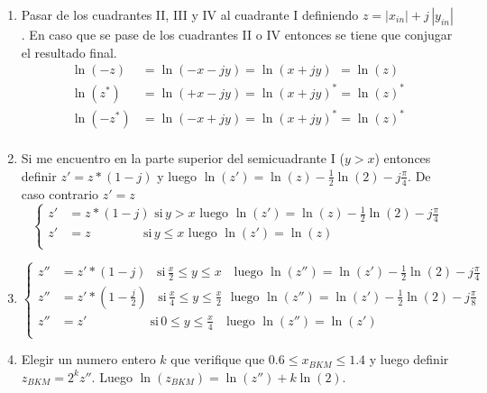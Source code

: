 \documentclass[10pt,a4paper]{book}
\begin{document}
   \begin{enumerate}
      \item{Pasar de los cuadrantes II, III y IV al cuadrante I definiendo $z = |x_{in}| + j \, |y_{in}|$. En caso que se pase de los cuadrantes II o IV entonces se tiene que conjugar el resultado final.
   \begin{equation} \label{eq:log_z_prop}
      \begin{aligned}
         \ln(-z)        &=\ln(-x -j y)  = \ln( x+ j y)    \ \,  =\ln(z)        \\
         \ln( z^\ast)   &=\ln(+x -j y)  = {\ln( x+ j y)}^{\ast} =\ln(z)^\ast   \\
         \ln(-z^\ast)   &=\ln(-x +j y)  = {\ln( x+ j y)}^{\ast} =\ln(z)^\ast   \\
      \end{aligned}
   \end{equation}
      }
      \item{Si me encuentro en la parte superior del semicuadrante I ($y>x$) entonces definir $z'=z*(1-j)$ y luego $\ln(z')=\ln(z)-\frac{1}{2}\ln(2)-j\frac{\pi}{4}$. De caso contrario $z'=z$
         \begin{equation} \label{eq:L_range_ext_2}
            \left\{
               \begin{aligned}
                  z' &= z*(1-j) \,\,                  \text{si}\, y   >  x    \,\,\text{luego}\,\, \ln(z')=\ln(z)-\frac{1}{2}\ln(2)-j\frac{\pi}{4}\\
                  z' &= z       \quad\quad\quad\quad\,\text{si}\, y \leq x    \,\,\text{luego}\,\, \ln(z')=\ln(z)                                 \\
               \end{aligned}
            \right.
         \end{equation}

      }
      \item{
         \begin{equation} \label{eq:L_range_ext_3}
            \left\{
               \begin{aligned}
                  z'' &= z'*(1-j)            \,\,\,\,\,  \text{si}\, \frac{x}{2} \leq y \leq        x       \,\,\,\,\,\,\text{luego}\,\, \ln(z'')=\ln(z')-\frac{1}{2}\ln(2)-j\frac{\pi}{4}\\
                  z'' &= z'*(1-\frac{j}{2})  \,\,\,\,\,  \text{si}\, \frac{x}{4} \leq y \leq  \frac{x}{2}       \,\,\,\,\text{luego}\,\, \ln(z'')=\ln(z')-\frac{1}{2}\ln(2)-j\frac{\pi}{8}\\
                  z'' &= z' \quad\quad\quad\quad\quad    \text{si}\, 0           \leq y \leq  \frac{x}{4}   \,\,\,\,\,\,\text{luego}\,\, \ln(z'')=\ln(z')                                 \\
               \end{aligned}
            \right.
         \end{equation}
      }
   \item{Elegir un numero entero $k$ que verifique que $0.6 \leq x_{BKM} \leq 1.4$ y luego definir $z_{BKM}=2^k z''$. Luego $\ln(z_{BKM})=\ln(z'')+k \ln(2)$.}
   \end{enumerate}
\end{document}
